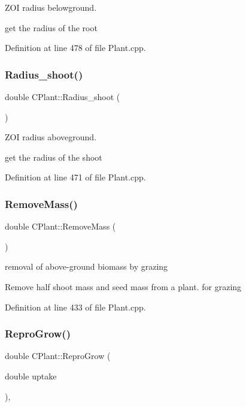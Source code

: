Z\+OI radius belowground. 

get the radius of the root 

Definition at line 478 of file Plant.\+cpp.

\mbox{\label{class_c_plant_a9a3ec11bb76d2264c31d0e0154df03a8}} 
\subsubsection{\texorpdfstring{Radius\_shoot()}{Radius\_shoot()}}
{\footnotesize\ttfamily double C\+Plant\+::\+Radius\+\_\+shoot (\begin{DoxyParamCaption}{ }\end{DoxyParamCaption})}



Z\+OI radius aboveground. 

get the radius of the shoot 

Definition at line 471 of file Plant.\+cpp.

\mbox{\label{class_c_plant_aa39451abceca77342e6bdbc90ebf425e}} 
\subsubsection{\texorpdfstring{RemoveMass()}{RemoveMass()}}
{\footnotesize\ttfamily double C\+Plant\+::\+Remove\+Mass (\begin{DoxyParamCaption}{ }\end{DoxyParamCaption})}



removal of above-\/ground biomass by grazing 

Remove half shoot mass and seed mass from a plant. for grazing 

Definition at line 433 of file Plant.\+cpp.

\mbox{\label{class_c_plant_a250f847e35537bb60a94cf5d3ce90812}} 
\subsubsection{\texorpdfstring{ReproGrow()}{ReproGrow()}}
{\footnotesize\ttfamily double C\+Plant\+::\+Repro\+Grow (\begin{DoxyParamCaption}\item[{double}]{uptake }\end{DoxyParamCaption})\hspace{0.3cm}{\ttfamily [protected]}, {\ttfamily [virtual]}}



